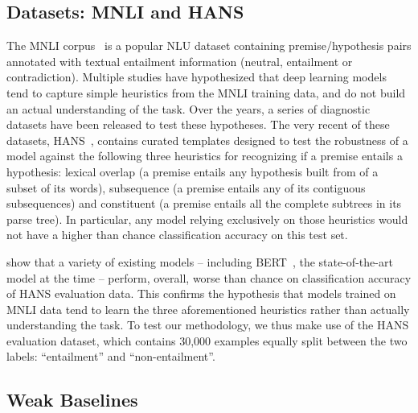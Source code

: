 

\subsection{Datasets: MNLI and HANS}
\label{sec:dataset}
The MNLI corpus~\citep{williams2017broad} is a popular NLU dataset containing premise/hypothesis pairs annotated with textual entailment information (neutral, entailment or contradiction). Multiple studies have hypothesized that deep learning models tend to capture simple heuristics from the MNLI training data, and do not build an actual understanding of the task. Over the years, a series of diagnostic datasets have been released to test these hypotheses.
The very recent of these datasets, HANS~\citep[Heuristic Analysis for NLI Systems]{linzen2019right}, contains curated templates designed to test the robustness of a model against the following three heuristics for recognizing if a premise entails a hypothesis: lexical overlap (a premise entails any hypothesis built from of a subset of its words), subsequence (a premise entails any of its contiguous subsequences) and constituent (a premise entails all the complete subtrees in its parse tree). In particular, any model relying exclusively on those heuristics would not have a higher than chance classification accuracy on this test set.

\citet{linzen2019right} show that a variety of existing models -- including BERT~\citep{devlin2018bert}, the state-of-the-art model at the time -- perform, overall, worse than chance on classification accuracy of HANS evaluation data. This confirms the hypothesis that models trained on MNLI data tend to learn the three aforementioned heuristics rather than actually understanding the task. To test our methodology, we thus make use of the HANS evaluation dataset, which contains 30,000 examples equally split between the two labels: ``entailment'' and ``non-entailment''.

\subsection{Weak Baselines}

